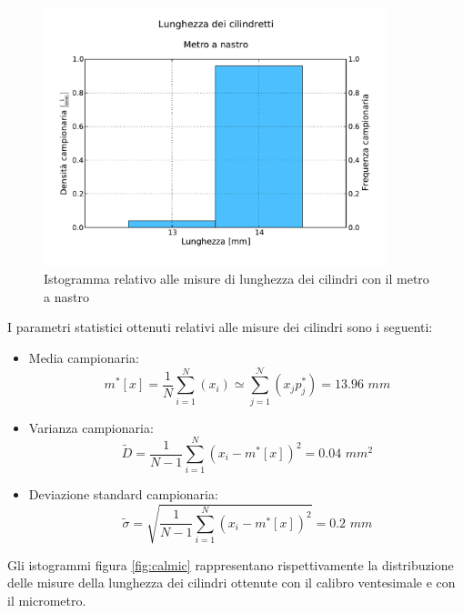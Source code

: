\begin{figure}
	\centering
	\includegraphics[width=100mm]{grafici/Cilindretti_metro.pdf}
	\caption{Istogramma relativo alle misure di lunghezza dei cilindri con il metro a nastro}
	\label{fig:metro}
\end{figure}

I parametri statistici ottenuti relativi alle misure dei cilindri sono
i seguenti:

\begin{itemize}
    \item{Media campionaria:}
        \begin{equation}
        m^*[x] = \frac{1}{N} \sum_{i=1}^{N} (x_i) \simeq \sum_{j=1}^{\mathcal{N}} (x_j p_j^*) = 13.96\,\,mm 
        \end{equation}

    \item{Varianza campionaria:}
        \begin{equation}
        \tilde{D} = \frac{1}{N - 1} \sum_{i=1}^{N} (x_i - m^*[x])^2 = 0.04\,\,mm^2
        \end{equation}

    \item{Deviazione standard campionaria:}
        \begin{equation}
        \tilde{\sigma} = \sqrt{\frac{1}{N - 1} \sum_{i=1}^{N} (x_i - m^*[x])^2} = 0.2\,\,mm
        \end{equation}
\end{itemize}

Gli istogrammi figura \ref{fig:calmic} rappresentano rispettivamente la distribuzione delle
misure della lunghezza dei cilindri ottenute con il calibro ventesimale e con
il micrometro.


